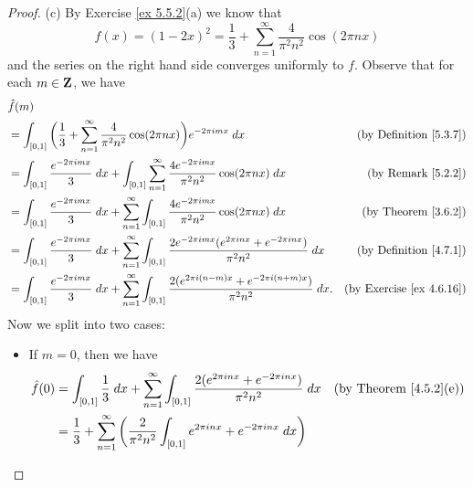 \begin{proof}{(c)}
    By Exercise \ref{ex 5.5.2}(a) we know that
    \[
        f(x) = (1 - 2x)^2 = \frac{1}{3} + \sum_{n = 1}^\infty \frac{4}{\pi^2 n^2} \cos(2 \pi n x)
    \]
    and the series on the right hand side converges uniformly to \(f\).
    Observe that for each \(m \in \mathbf{Z}\), we have
    \begin{align*}
         & \hat{f}(m)                                                                                                                                                                                                     \\
         & = \int_{[0, 1]} \bigg(\frac{1}{3} + \sum_{n = 1}^\infty \frac{4}{\pi^2 n^2} \cos(2 \pi n x)\bigg) e^{-2 \pi i m x} \; dx                                                & \text{(by Definition \ref{5.3.7})}   \\
         & = \int_{[0, 1]} \frac{e^{- 2 \pi i m x}}{3} \; dx + \int_{[0, 1]} \sum_{n = 1}^\infty \frac{4 e^{- 2 \pi i m x}}{\pi^2 n^2} \cos(2 \pi n x) \; dx                       & \text{(by Remark \ref{5.2.2})}       \\
         & = \int_{[0, 1]} \frac{e^{- 2 \pi i m x}}{3} \; dx + \sum_{n = 1}^\infty \int_{[0, 1]} \frac{4 e^{- 2 \pi i m x}}{\pi^2 n^2} \cos(2 \pi n x) \; dx                       & \text{(by Theorem \ref{3.6.2})}      \\
         & = \int_{[0, 1]} \frac{e^{- 2 \pi i m x}}{3} \; dx + \sum_{n = 1}^\infty \int_{[0, 1]} \frac{2 e^{- 2 \pi i m x} (e^{2 \pi i n x} + e^{- 2 \pi i n x})}{\pi^2 n^2} \; dx & \text{(by Definition \ref{4.7.1})}   \\
         & = \int_{[0, 1]} \frac{e^{- 2 \pi i m x}}{3} \; dx + \sum_{n = 1}^\infty \int_{[0, 1]} \frac{2 (e^{2 \pi i (n - m) x} + e^{- 2 \pi i (n + m) x})}{\pi^2 n^2} \; dx.      & \text{(by Exercise \ref{ex 4.6.16})}
    \end{align*}
    Now we split into two cases:
    \begin{itemize}
        \item If \(m = 0\), then we have
              \begin{align*}
                  \hat{f}(0) & = \int_{[0, 1]} \frac{1}{3} \; dx + \sum_{n = 1}^\infty \int_{[0, 1]} \frac{2 (e^{2 \pi i n x} + e^{- 2 \pi i n x})}{\pi^2 n^2} \; dx & \text{(by Theorem \ref{4.5.2}(e))} \\
                             & = \frac{1}{3} + \sum_{n = 1}^\infty \bigg(\frac{2}{\pi^2 n^2} \int_{[0, 1]} e^{2 \pi i n x} + e^{- 2 \pi i n x} \; dx\bigg)                                                \\

\end{align*}
\end{itemize}
\end{proof}
